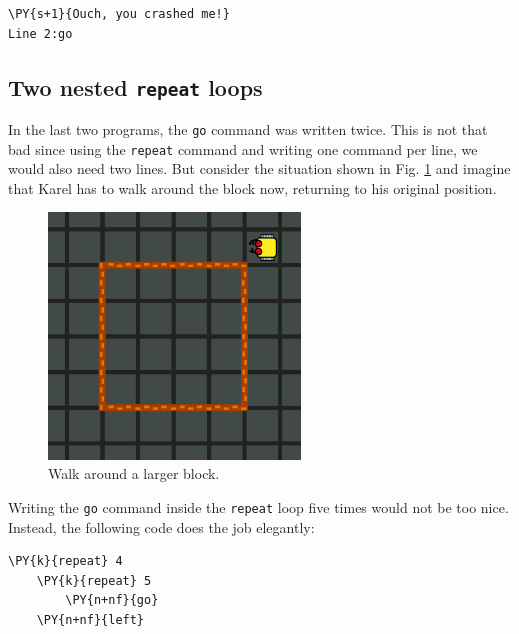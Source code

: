 \begin{ybox}
\begin{Verbatim}[commandchars=\\\{\}]
\PY{s+1}{Ouch, you crashed me!}
Line 2:go
\end{Verbatim}
\end{ybox}
\vspace{6mm}


\subsection{Two nested {\tt repeat} loops}

In the last two programs, the {\tt go} command was written twice. This is 
not that bad since using the {\tt repeat} command and writing one command 
per line, we would also need two lines. 
But consider the situation shown in Fig. \ref{fig:repeat-14} and imagine
that Karel has to walk around the block now, returning to his original 
position.
\newpage

\begin{figure}[!ht]
\begin{center}
\includegraphics[width=6.7cm]{img/repeat-14.png}
\vspace{-0mm}
\caption{Walk around a larger block.}
\label{fig:repeat-14}
\end{center}
\end{figure}
\noindent
Writing the {\tt go} command inside the {\tt repeat} loop five times would not be too nice.
Instead, the following code does the job elegantly:\\

\begin{bbox}
\begin{Verbatim}[commandchars=\\\{\}]
\PY{k}{repeat} 4
    \PY{k}{repeat} 5
        \PY{n+nf}{go}
    \PY{n+nf}{left}
\end{Verbatim}
\end{bbox}
\vspace{6mm}

